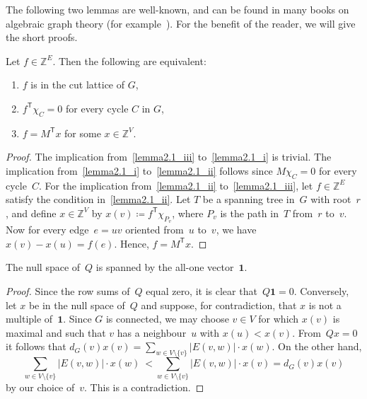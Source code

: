\documentclass[ALCO,ThmDefs,Unicode,epreuves]{cedram}
\newcommand{\Z}{\ensuremath{\mathbb{Z}}}
\newcommand{\transp}{\mathsf{T}}
\newcommand{\one}{\ensuremath{\mathbf{1}}}
\begin{document}
The following two lemmas are well-known, and can be found in many books on algebraic graph theory (for example~\cite{GodsilRoyle2001}). For the benefit of the reader, we will give the short proofs.
 
\begin{lemma}\label{clattice}
Let $f\in \Z^{E}$. Then the following are equivalent:
\begin{enumerate}[label=(\roman*)]
\item\label{lemma2.1_i} $f$ is in the cut lattice of $G$,
\item\label{lemma2.1_ii} $f^\transp\chi_C=0$ for every cycle $C$ in $G$,
\item\label{lemma2.1_iii} $f=M^\transp x$ for some $x\in \Z^{V}$.
\end{enumerate}
\end{lemma} 
\begin{proof}
The implication from~\ref{lemma2.1_iii} to~\ref{lemma2.1_i} is trivial. The implication from~\ref{lemma2.1_i} to~\ref{lemma2.1_ii} follows since $M\chi_C=0$ for every cycle~$C$. For the implication from~\ref{lemma2.1_ii} to~\ref{lemma2.1_iii}, let $f\in \Z^{E}$ satisfy the condition in~\ref{lemma2.1_ii}. Let $T$ be a spanning tree in~$G$ with root~$r$, and define $x\in \Z^V$ by $x(v)\coloneqq f^\transp\chi_{P_v}$, where $P_v$ is the path in~$T$ from~$r$ to~$v$. Now for every edge~$e=uv$ oriented from~$u$ to~$v$, we have $x(v)-x(u)=f(e)$. Hence, $f=M^\transp x$.
\end{proof}

\begin{lemma}\label{Laplacian}
The null space of~$Q$ is spanned by the all-one vector~$\one$.
\end{lemma}
\begin{proof}
Since the row sums of~$Q$ equal zero, it is clear that~$Q\one=0$. Conversely, let $x$ be in the null space of~$Q$ and suppose, for contradiction, that $x$ is not a multiple of~$\one$. Since $G$ is connected, we may choose $v\in V$ for which $x(v)$ is maximal and such that $v$ has a neighbour~$u$ with $x(u) < x(v)$. From~$Qx=0$ it follows that $d_G(v)x(v)=\sum_{w\in V\setminus\{v\}} |E(v,w)|\cdot x(w)$. On the other hand,
\begin{equation*}
\sum_{w\in V\setminus\{v\}}|E(v,w)|\cdot x(w)\ < \sum_{w\in V\setminus\{v\}}|E(v,w)|\cdot x(v)= d_G(v)x(v)
\end{equation*}
by our choice of~$v$. This is a contradiction. 
\end{proof}
\end{document}
